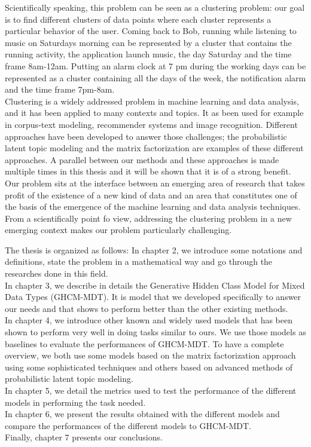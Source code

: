 Scientifically speaking, this problem can be seen as a clustering problem: our goal is to find different clusters of data points where each cluster represents a particular behavior of the user. Coming back to Bob, running while listening to music on Saturdays morning can be represented by a cluster that contains the running activity, the application launch music, the day Saturday and the time frame 8am-12am. Putting an alarm clock at 7 pm during the working days can be represented as a cluster containing all the days of the week, the notification alarm and the time frame 7pm-8am. 
\\Clustering is a widely addressed problem in machine learning and data analysis, and it has been applied to many contexts and topics. It as been used for example in corpus-text modeling, recommender systems and image recognition. Different approaches have been developed to answer those challenges; the probabilistic latent topic modeling and the matrix factorization are examples of these different approaches. A parallel between our methods and these approaches is made multiple times in this thesis and it will be shown that it is of a strong benefit. 
\\Our problem sits at the interface between an emerging area of research that takes profit of the existence of a new kind of data and an area that constitutes one of the basis of the emergence of the machine learning and data analysis techniques. From a scientifically point fo view, addressing the clustering problem in a new emerging context makes our problem particularly challenging. \par

The thesis is organized as follows: In chapter 2, we introduce some notations and definitions, state the problem in a mathematical way and go through the researches done in this field. 
\\In chapter 3, we describe in details the Generative Hidden Class Model for Mixed Data Types (GHCM-MDT). It is model that we developed specifically to answer our needs and that shows to perform better than the other existing methods.
\\In chapter 4, we introduce other known and widely used models that has been shown to perform very well in doing tasks similar to ours. We use those models as baselines to evaluate the performances of GHCM-MDT. To have a complete overview, we both use some models based on the matrix factorization approach using some sophisticated techniques and others based on advanced methods of probabilistic latent topic modeling.
\\In chapter 5, we detail the metrics used to test the performance of the different models in performing the task needed.
\\In chapter 6, we present the results obtained with the different models and compare the performances of the different models to GHCM-MDT.
\\Finally, chapter 7 presents our conclusions.

